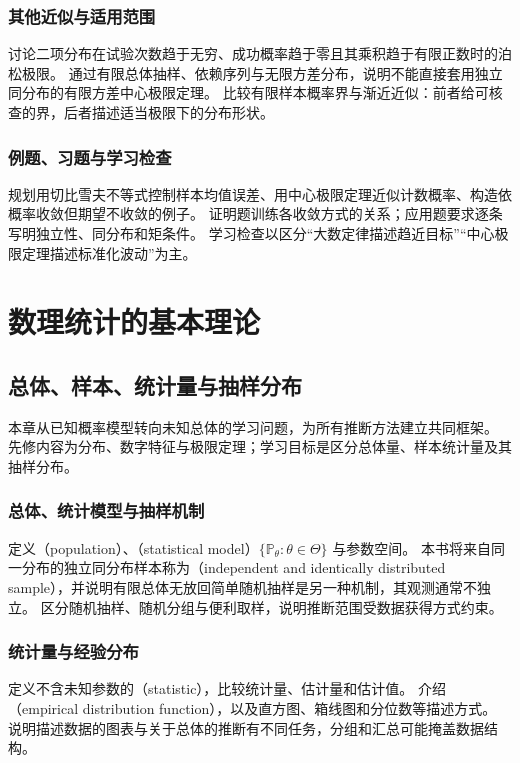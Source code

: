 \documentclass[UTF8,12pt,a4paper,fontset=fandol]{ctexbook}
\begin{document}
\section{其他近似与适用范围}
\label{sec:ps-approximation-boundaries}
讨论二项分布在试验次数趋于无穷、成功概率趋于零且其乘积趋于有限正数时的泊松极限。
通过有限总体抽样、依赖序列与无限方差分布，说明不能直接套用独立同分布的有限方差中心极限定理。
比较有限样本概率界与渐近近似：前者给可核查的界，后者描述适当极限下的分布形状。

\section{例题、习题与学习检查}
规划用切比雪夫不等式控制样本均值误差、用中心极限定理近似计数概率、构造依概率收敛但期望不收敛的例子。
证明题训练各收敛方式的关系；应用题要求逐条写明独立性、同分布和矩条件。
学习检查以区分“大数定律描述趋近目标”“中心极限定理描述标准化波动”为主。


\part{数理统计的基本理论}

\chapter{总体、样本、统计量与抽样分布}
\label{chap:ps-sampling}

本章从已知概率模型转向未知总体的学习问题，为所有推断方法建立共同框架。
先修内容为分布、数字特征与极限定理；学习目标是区分总体量、样本统计量及其抽样分布。

\section{总体、统计模型与抽样机制}
\label{sec:ps-statistical-model}
定义（population）、（statistical model）$\{\mathbb P_\theta:\theta\in\Theta\}$ 与参数空间。
本书将来自同一分布的独立同分布样本称为（independent and identically distributed sample），并说明有限总体无放回简单随机抽样是另一种机制，其观测通常不独立。
区分随机抽样、随机分组与便利取样，说明推断范围受数据获得方式约束。

\section{统计量与经验分布}
\label{sec:ps-statistics-empirical}
定义不含未知参数的（statistic），比较统计量、估计量和估计值。
介绍（empirical distribution function），以及直方图、箱线图和分位数等描述方式。
说明描述数据的图表与关于总体的推断有不同任务，分组和汇总可能掩盖数据结构。
\end{document}
